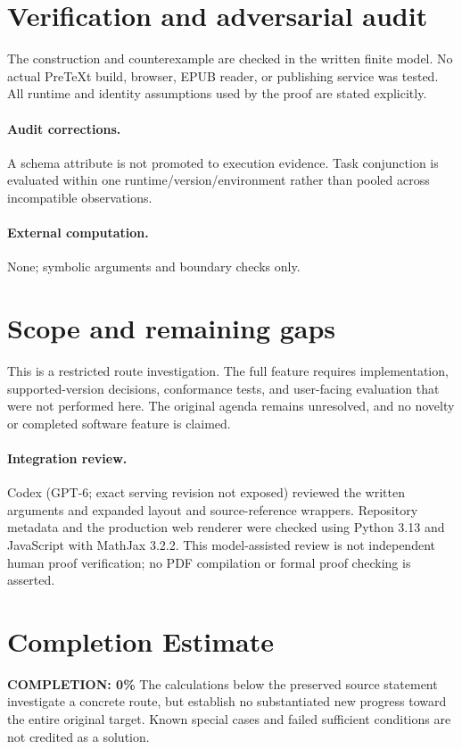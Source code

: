 \documentclass[11pt]{article}
\begin{document}
\section{Verification and adversarial audit}
The construction and counterexample are checked in the written finite model. No actual PreTeXt build, browser, EPUB reader, or publishing service was tested. All runtime and identity assumptions used by the proof are stated explicitly.
\paragraph{Audit corrections.} A schema attribute is not promoted to execution evidence. Task conjunction is evaluated within one runtime/version/environment rather than pooled across incompatible observations.
\paragraph{External computation.} None; symbolic arguments and boundary checks only.
\section{Scope and remaining gaps}
This is a restricted route investigation. The full feature requires implementation, supported-version decisions, conformance tests, and user-facing evaluation that were not performed here. The original agenda remains unresolved, and no novelty or completed software feature is claimed.
\paragraph{Integration review.} Codex (GPT-6; exact serving revision not exposed) reviewed the written arguments and expanded layout and source-reference wrappers. Repository metadata and the production web renderer were checked using Python 3.13 and JavaScript with MathJax 3.2.2. This model-assisted review is not independent human proof verification; no PDF compilation or formal proof checking is asserted.

\section{Completion Estimate}
\noindent\textbf{COMPLETION: 0\%}
The calculations below the preserved source statement investigate a concrete route,
but establish no substantiated new progress toward the entire original target.
Known special cases and failed sufficient conditions are not credited as a solution.
\end{document}

